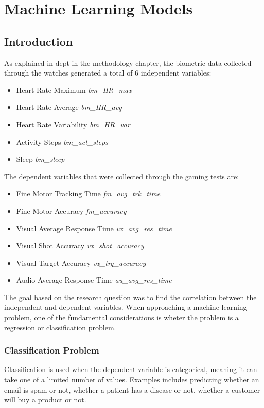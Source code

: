 \chapter{Machine Learning Models}

\section{Introduction}
As explained in dept in the methodology chapter, the biometric data collected through the watches generated a total of 6 independent variables:

\begin{itemize}
    \item Heart Rate Maximum \textit{bm\_HR\_max}
    \item Heart Rate Average \textit{bm\_HR\_avg}
    \item Heart Rate Variability \textit{bm\_HR\_var}
    \item Activity Steps \textit{bm\_act\_steps}
    \item Sleep \textit{bm\_sleep}
\end{itemize}

The dependent variables that were collected through the gaming tests are:

\begin{itemize}
    \item Fine Motor Tracking Time \textit{fm\_avg\_trk\_time}
    \item Fine Motor Accuracy \textit{fm\_accuracy}
    \item Visual Average Response Time \textit{vx\_avg\_res\_time}
    \item Visual Shot Accuracy \textit{vx\_shot\_accuracy}
    \item Visual Target Accuracy \textit{vx\_trg\_accuracy}
    \item Audio Average Response Time \textit{au\_avg\_res\_time}
\end{itemize}

The goal based on the research question was to find the correlation between the independent and dependent variables. When approaching a machine learning problem, one of the fundamental
considerations is wheter the problem is a regression or classification problem. 

\subsection*{Classification Problem}
Classification is used when the dependent variable is categorical, meaning it can take one of a limited number of values. Examples includes predicting whether an email is spam or not,
whether a patient has a disease or not, whether a customer will buy a product or not. 

